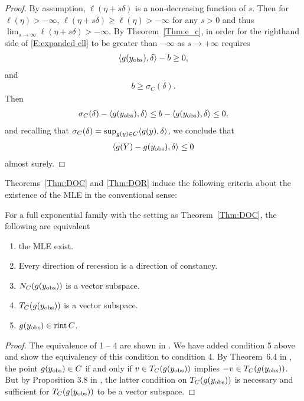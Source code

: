 \begin{proof}
By assumption, $\ell(\eta + s\delta)$ is a non-decreasing function of $s$.  
Then for $\ell(\eta ) > -\infty$, $\ell(\eta + s\delta) \geq \ell(\eta )  > -\infty$
for any $s>0$ and thus $\lim_{s \to \infty} \ell(\eta+s\delta) > -\infty$.
By Theorem~\ref{Thm:e_c}, in order for the righthand side of \eqref{E:expanded ell} 
to be greater than $-\infty$ as $s \to +\infty$ requires
\begin{align*}
	\langle g(y_{\text{obs}}), \delta \rangle - b \geq 0,
\end{align*}
and
\begin{align*}
	b \geq \sigma_C(\delta). %
\end{align*}
Then
\begin{align*}
	\sigma_C(\delta)  - \langle g(y_{\text{obs}}), \delta \rangle \leq b - \langle g(y_{\text{obs}}), \delta \rangle  \leq 0,
\end{align*}
and recalling that $\sigma_C(\delta) = \sup_{g(y) \in C} \langle g(y), \delta \rangle$, 
we conclude that
\begin{align*}
	\langle g(Y) - g(y_{\text{obs}}),\delta  \rangle \leq 0
\end{align*}
almost surely.
\end{proof}

Theorems~\ref{Thm:DOC} and \ref{Thm:DOR} induce the following criteria about the
existence of the MLE in the conventional sense:

\begin{theorem} \label{Thm:MLE existence}
For a full exponential family with the setting as Theorem~\ref{Thm:DOC}, the 
following are equivalent 
\begin{enumerate}
\item the MLE exist.
\item Every direction of recession is a direction of constancy.
\item $N_C(g(y_{\text{obs}}))$ is a vector subspace.
\item $T_C(g(y_{\text{obs}}))$ is a vector subspace.
\item $g(y_{\text{obs}}) \in \operatorname{rint} C$.
\end{enumerate}
\end{theorem}
\begin{proof}
The equivalence of 1 -- 4 are shown in \citep{Geyer:gdor}.  We have added condition 5 above
and show the equivalency of this condition to condition 4.  By Theorem~6.4 in 
\citet{Rockafellar:1970}, the point $g(y_{\text{obs}}) \in C$ if and only if 
$v \in T_C(g(y_{\text{obs}}))$ implies $-v \in T_C(g(y_{\text{obs}}))$.  But by Proposition 3.8 in 
\citet{Rockafellar}, the latter condition on  $T_C(g(y_{\text{obs}}))$ is necessary and sufficient 
for  $T_C(g(y_{\text{obs}}))$ to be a vector subspace.
\end{proof}

